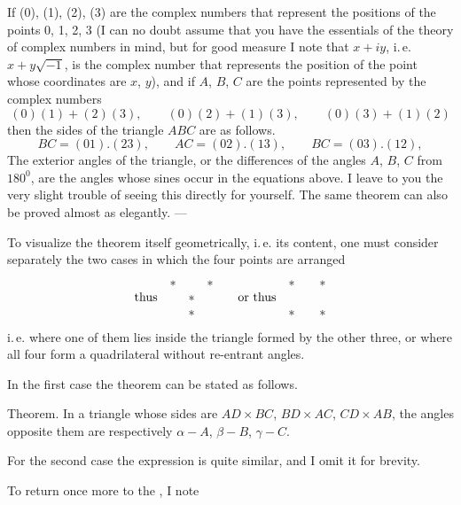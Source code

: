 If (0), (1), (2), (3) are the complex numbers that represent the positions of the points 0, 1, 2, 3 (I can no doubt assume that you have the essentials of the theory of complex numbers in mind, but for good measure I note that $x+iy$, i.\,e. $x+y\sqrt{-1}$, is the complex number that represents the position of the point whose coordinates are $x$, $y$), and if $A$, $B$, $C$ are the points represented by the complex numbers
\[
(0)(1)+(2)(3),\qquad (0)(2)+(1)(3),\qquad (0)(3)+(1)(2)
\]
then the sides of the triangle $ABC$ are as follows.
\[
BC=(01).(23),\qquad AC=(02).(13),\qquad BC=(03).(12), \]
The exterior angles of the triangle, or the differences of the angles $A$, $B$, $C$ from $180^0$, are the angles whose sines occur in the equations above. I leave to you the very slight trouble of seeing this directly for yourself. The same theorem can also be proved  almost as elegantly. —

To visualize the theorem itself geometrically, i.\,e. its content, one must consider separately the two cases in which the four points are arranged
\[
\begin{array}{c@{\quad}ccc@{\qquad}c@{\quad}ccc}
 & * & & * & & * & & *\\
\text{thus} & & * & & \text{or thus} & & &\\
 & & * & & & * & & *
\end{array}
\]
i.\,e. where one of them lies inside the triangle formed by the other three, or where all four form a quadrilateral without re-entrant angles.

In the first case the theorem can be stated as follows.

Theorem. In a triangle whose sides are $AD\times BC$, $BD\times AC$, $CD\times AB$, the angles opposite them are respectively $\alpha-A$, $\beta-B$, $\gamma-C$.

\begin{center}\end{center}

For the second case the expression is quite similar, and I omit it for brevity.

To return once more to the , I note\space%
